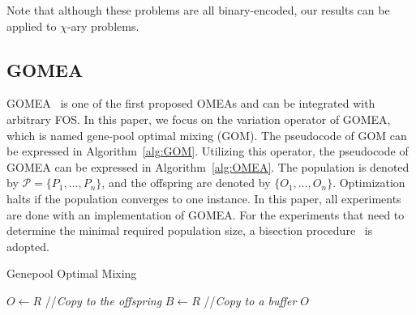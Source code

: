 \documentclass{sig-alternate}
\begin{document}
Note that although these problems are all binary-encoded,
our results can be applied to $\chi$-ary problems.

\subsection{GOMEA}
GOMEA~\cite{2011_OMEA} is one of the first proposed OMEAs and can be integrated with arbitrary FOS.
In this paper, we focus on the variation operator of GOMEA, which is named gene-pool optimal mixing (GOM).
The pseudocode of GOM can be expressed in Algorithm~\ref{alg:GOM}.
Utilizing this operator,
the pseudocode of GOMEA can be expressed in Algorithm~\ref{alg:OMEA}.
The population is denoted by $\mathcal P=\{P_1, \dots, P_n\}$, and
the offspring are denoted by $\{O_1, \dots, O_n\}$.
Optimization halts if the population converges to one instance.
In this paper, all experiments are done with an implementation of GOMEA.
For the experiments that need to determine the minimal required population size, a bisection procedure~\cite{2001_bisection} is adopted.

\begin{algorithm}[h]
\DontPrintSemicolon
\caption{Genepool Optimal Mixing}
\label{alg:GOM}
\BlankLine
$O \gets R$ //{\it Copy to the offspring} \;
$B \gets R$ //{\it Copy to a buffer} \;
\Return $O$
\end{algorithm}
\end{document}
